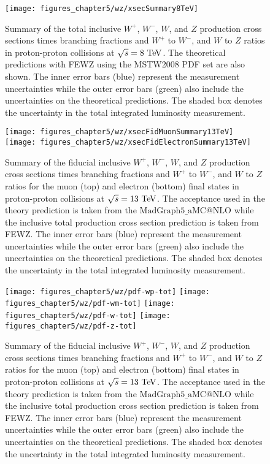 \begin{figure}[h]
\centering
\texttt{[image: figures\_chapter5/wz/xsecSummary8TeV]}
\caption{Summary of the total inclusive $W^+$, $W^-$, $W$, and $Z$ production cross sections times branching fractions and $W^+$ to $W^-$, and $W$ to $Z$ ratios in proton-proton collisions at $\sqrt{s}=8~\mathrm{Te\kern -0.1em V}$. The theoretical predictions with FEWZ using the MSTW2008 PDF set are also shown. The inner error bars (blue) represent the measurement uncertainties while the outer error bars (green) also include the uncertainties on the theoretical predictions. The shaded box denotes the uncertainty in the total integrated luminosity measurement.}
\label{fig:8tev}
\end{figure}

\begin{figure}[h]
\centering
\texttt{[image: figures\_chapter5/wz/xsecFidMuonSummary13TeV]}
\texttt{[image: figures\_chapter5/wz/xsecFidElectronSummary13TeV]}
\caption{Summary of the fiducial inclusive $W^+$, $W^-$, $W$, and $Z$ production cross sections times branching fractions and $W^+$ to $W^-$, and $W$ to $Z$ ratios for the muon (top) and electron (bottom) final states in proton-proton collisions at $\sqrt{s}=13~\mathrm{Te\kern -0.1em V}$. The acceptance used in the theory prediction is taken from the $\mathrm{MadGraph5}\_\mathrm{aMC@NLO}$ while the inclusive total production cross section prediction is taken from FEWZ. The inner error bars (blue) represent the measurement uncertainties while the outer error bars (green) also include the uncertainties on the theoretical predictions. The shaded box denotes the uncertainty in the total integrated luminosity measurement.}
\label{fig:fid}
\end{figure}


\begin{figure}[h]
\centering
\texttt{[image: figures\_chapter5/wz/pdf-wp-tot]}
\texttt{[image: figures\_chapter5/wz/pdf-wm-tot]}
\texttt{[image: figures\_chapter5/wz/pdf-w-tot]}
\texttt{[image: figures\_chapter5/wz/pdf-z-tot]}
\caption{Summary of the fiducial inclusive $W^+$, $W^-$, $W$, and $Z$ production cross sections times branching fractions and $W^+$ to $W^-$, and $W$ to $Z$ ratios for the muon (top) and electron (bottom) final states in proton-proton collisions at $\sqrt{s}=13~\mathrm{Te\kern -0.1em V}$. The acceptance used in the theory prediction is taken from the $\mathrm{MadGraph5}\_\mathrm{aMC@NLO}$ while the inclusive total production cross section prediction is taken from FEWZ. The inner error bars (blue) represent the measurement uncertainties while the outer error bars (green) also include the uncertainties on the theoretical predictions. The shaded box denotes the uncertainty in the total integrated luminosity measurement.}
\label{fig:pdf_tot}
\end{figure}


